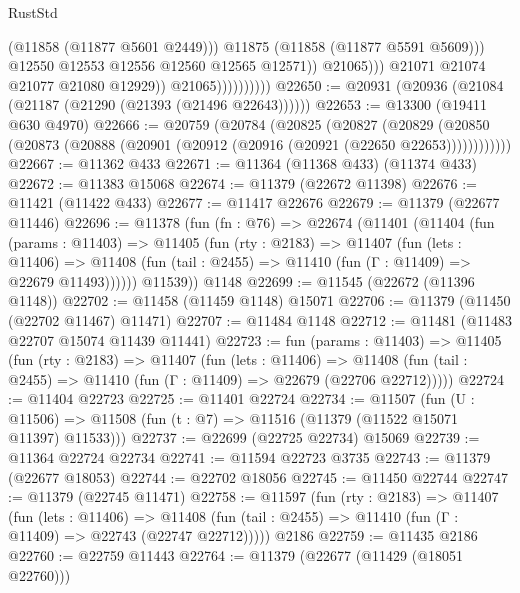 \begin{lexlean}{RustStd}
\begin{coremodule}
                                          (@11858 (@11877 @5601 @2449)))
                                        @11875
                                        (@11858 (@11877 @5591 @5609)))
                                      @12550
                                      @12553
                                      @12556
                                      @12560
                                      @12565
                                      @12571))
                                  @21065)))
                            @21071
                            @21074
                            @21077
                            @21080
                            @12929))
                        @21065))))))))))
@22650 := @20931 (@20936 (@21084 (@21187 (@21290 (@21393 (@21496 @22643))))))
@22653 := @13300 (@19411 @630 @4970)
@22666 := @20759
    (@20784
      (@20825
        (@20827
          (@20829 (@20850 (@20873 (@20888 (@20901 (@20912 (@20916 (@20921 (@22650 @22653))))))))))))
@22667 := @11362 @433
@22671 := @11364 (@11368 @433) (@11374 @433)
@22672 := @11383 @15068
@22674 := @11379 (@22672 @11398)
@22676 := @11421 (@11422 @433)
@22677 := @11417 @22676
@22679 := @11379 (@22677 @11446)
@22696 := @11378
    (fun (fn : @76) =>
    @22674
      (@11401
        (@11404
          (fun (params : @11403) =>
          @11405
            (fun (rty : @2183) =>
            @11407
              (fun (lets : @11406) =>
              @11408 (fun (tail : @2455) => @11410 (fun (Γ : @11409) => @22679 @11493))))))
        @11539))
    @1148
@22699 := @11545 (@22672 (@11396 @1148))
@22702 := @11458 (@11459 @1148) @15071
@22706 := @11379 (@11450 (@22702 @11467) @11471)
@22707 := @11484 @1148
@22712 := @11481 (@11483 @22707 @15074 @11439 @11441)
@22723 := fun (params : @11403) =>
  @11405
    (fun (rty : @2183) =>
    @11407
      (fun (lets : @11406) =>
      @11408 (fun (tail : @2455) => @11410 (fun (Γ : @11409) => @22679 (@22706 @22712)))))
@22724 := @11404 @22723
@22725 := @11401 @22724
@22734 := @11507
    (fun (U : @11506) => @11508 (fun (t : @7) => @11516 (@11379 (@11522 @15071 @11397) @11533)))
@22737 := @22699 (@22725 @22734) @15069
@22739 := @11364 @22724 @22734
@22741 := @11594 @22723 @3735
@22743 := @11379 (@22677 @18053)
@22744 := @22702 @18056
@22745 := @11450 @22744
@22747 := @11379 (@22745 @11471)
@22758 := @11597
    (fun (rty : @2183) =>
    @11407
      (fun (lets : @11406) =>
      @11408 (fun (tail : @2455) => @11410 (fun (Γ : @11409) => @22743 (@22747 @22712)))))
    @2186
@22759 := @11435 @2186
@22760 := @22759 @11443
@22764 := @11379 (@22677 (@11429 (@18051 @22760)))

\end{coremodule}
\end{lexlean}
